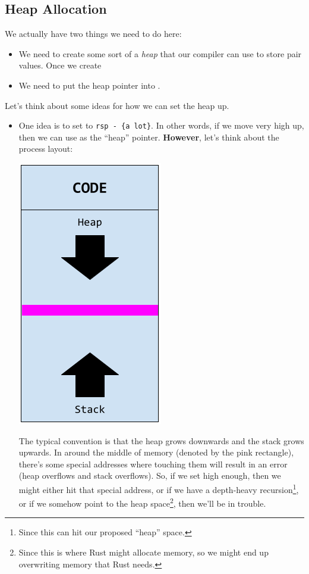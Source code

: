\subsection{Heap Allocation}
We actually have two things we need to do here: 
\begin{itemize}
    \item We need to create some sort of a \emph{heap} that our compiler can use to store pair values. Once we create 
    \item We need to put the heap pointer into .
\end{itemize}
Let's think about some ideas for how we can set the heap up.
\begin{itemize}
    \item One idea is to set  to \verb|rsp - {a lot}|. In other words, if we move  very high up, then we can use  as the ``heap'' pointer. \textbf{However}, let's think about the process layout:
    \begin{center}
        \includegraphics[scale=0.4]{assets/process_layout.png}
    \end{center}
    The typical convention is that the heap grows downwards and the stack grows upwards. In around the middle of memory (denoted by the pink rectangle), there's some special addresses where touching them will result in an error (heap overflows and stack overflows). So, if we set  high enough, then we might either hit that special address, or if we have a depth-heavy recursion\footnote{Since this can hit our proposed ``heap'' space.}, or if we somehow point  to the heap space\footnote{Since this is where Rust might allocate memory, so we might end up overwriting memory that Rust needs.}, then we'll be in trouble. 


\end{itemize}
